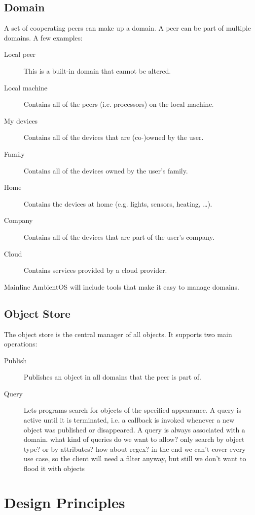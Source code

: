 \documentclass[a4paper]{article}
\begin{document}
\subsection{Domain}
A set of cooperating peers can make up a domain. A peer can be part of multiple domains. A few examples:

\begin{description}
  \item[Local peer] This is a built-in domain that cannot be altered.
  \item[Local machine] Contains all of the peers (i.e. processors) on the local machine.
  \item[My devices] Contains all of the devices that are (co-)owned by the user.
  \item[Family] Contains all of the devices owned by the user's family.
  \item[Home] Contains the devices at home (e.g. lights, sensors, heating, \ldots).
  \item[Company] Contains all of the devices that are part of the user's company.
  \item[Cloud] Contains services provided by a cloud provider.
\end{description}

Mainline AmbientOS will include tools that make it easy to manage domains.


\subsection{Object Store}
The object store is the central manager of all objects. It supports two main operations:

\begin{description}
  \item[Publish] Publishes an object in all domains that the peer is part of.
  \item[Query] Lets programs search for objects of the specified appearance. A query is active until it is terminated, i.e. a callback is invoked whenever a new object was published or disappeared. A query is always associated with a domain.
{\q what kind of queries do we want to allow? only search by object type? or by attributes? how about regex? in the end we can't cover every use case, so the client will need a filter anyway, but still we don't want to flood it with objects}
\end{description}


\section{Design Principles}
\end{document}
